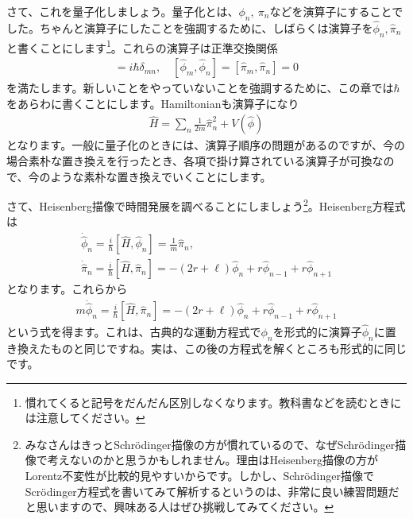 \documentclass[report,paper=a4, fontsize=12pt, line_length=16cm, number_of_lines=33,dvipdfmx]{jlreq}
\numberwithin{equation}{chapter}
\newcommand{\phih}{\hat{\phi}}
\newcommand{\pih}{\hat{\pi}}
\newcommand{\Hh}{\widehat{H}}
\begin{document}
さて、これを量子化しましょう。量子化とは、$\phi_n,\ \pi_n$などを演算子にすることでした。ちゃんと演算子にしたことを強調するために、しばらくは演算子を$\phih_n,\pih_n$と書くことにします\footnote{慣れてくると記号をだんだん区別しなくなります。教科書などを読むときには注意してください。}。これらの演算子は正準交換関係
\begin{align}
  [\phih_m,\pih_n]=i\hbar\delta_{mn},\quad
  [\phih_m,\phih_n]=[\pih_m,\pih_n]=0\label{canonicalcommutationrelation}
\end{align}
を満たします。新しいことをやっていないことを強調するために、この章では$\hbar$をあらわに書くことにします。Hamiltonianも演算子になり
\begin{align}
  \Hh=\sum_{n}\frac{1}{2m}\pih_n^2+V(\phih)
\end{align}
となります。一般に量子化のときには、演算子順序の問題があるのですが、今の場合素朴な置き換えを行ったとき、各項で掛け算されている演算子が可換なので、今のような素朴な置き換えでいくことにします。

さて、Heisenberg描像で時間発展を調べることにしましょう\footnote{みなさんはきっとSchrödinger描像の方が慣れているので、なぜSchrödinger描像で考えないのかと思うかもしれません。理由はHeisenberg描像の方がLorentz不変性が比較的見やすいからです。しかし、Schrödinger描像でScrödinger方程式を書いてみて解析するというのは、非常に良い練習問題だと思いますので、興味ある人はぜひ挑戦してみてください。}。Heisenberg方程式は
\begin{align}
  \dot{\phih}_n=\frac{i}{\hbar}[\Hh,\phih_n]=\frac{1}{m}\pih_n,\\
  \dot{\pih}_n=\frac{i}{\hbar}[\Hh,\pih_n]=-(2r+\ell)\phih_n+r \phih_{n-1}+r\phih_{n+1}
\end{align}
となります。これらから
\begin{align}
  m\ddot{\phih}_n=\frac{i}{\hbar}[\Hh,\pih_n]=-(2r+\ell)\phih_n+r \phih_{n-1}+r\phih_{n+1}\label{oscillatoreom}
\end{align}
という式を得ます。これは、古典的な運動方程式で$\phi_n$を形式的に演算子$\phih_n$に置き換えたものと同じですね。実は、この後の方程式を解くところも形式的に同じです。
\end{document}
